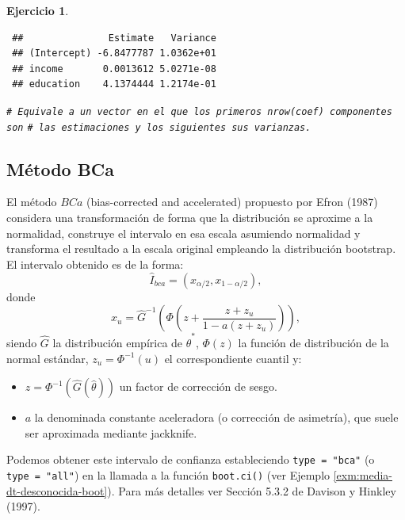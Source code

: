 \documentclass[
  spanish,
  10pt,
]{book}
\newenvironment{Shaded}{\begin{snugshade}}{\end{snugshade}}
\newcommand{\CommentTok}[1]{\textcolor[rgb]{0.56,0.35,0.01}{\textit{#1}}}
\providecommand{\tightlist}{%
  \setlength{\itemsep}{0pt}\setlength{\parskip}{0pt}}
\theoremstyle{break}
\newtheorem{exercise}{Ejercicio}[chapter]
\theoremstyle{nonumberplain}
\renewcommand{\CommentTok}[1]{\textcolor[rgb]{0.41,0.41,0.41}{\texttt{#1}}}
\begin{document}
\begin{exercise}
\begin{verbatim}
 ##               Estimate   Variance
 ## (Intercept) -6.8477787 1.0362e+01
 ## income       0.0013612 5.0271e-08
 ## education    4.1374444 1.2174e-01
\end{verbatim}

\begin{Shaded}
\begin{Highlighting}[]
\CommentTok{\# Equivale a un vector en el que los primeros \textasciigrave{}nrow(coef)\textasciigrave{} componentes son}
\CommentTok{\# las estimaciones y los siguientes sus varianzas.}
\end{Highlighting}
\end{Shaded}

\end{exercise}

\subsection{Método BCa}\label{boot-ic-bca}

El método \(BCa\) (bias-corrected and accelerated) propuesto por Efron (1987) considera una transformación de forma que la distribución se aproxime a la normalidad, construye el intervalo en esa escala asumiendo normalidad y transforma el resultado a la escala original empleando la distribución bootstrap.
El intervalo obtenido es de la forma:
\[\hat{I}_{bca}=\left( x_{\alpha /2}, x_{1-\alpha /2}  \right),\]
donde\\
\[x_u = \hat G^{-1}\left(\Phi\left(z + \frac{z + z_u}{1-a(z+z_u)}\right)  \right),\]
siendo \(\hat G\) la distribución empírica de \(\hat{\theta}^{\ast}\), \(\Phi(z)\) la función de distribución de la normal estándar, \(z_u = \Phi^{-1}(u)\) el correspondiente cuantil y:

\begin{itemize}
\tightlist
\item
  \(z = \Phi^{-1}(\hat G(\hat\theta))\) un factor de corrección de sesgo.
\item
  \(a\) la denominada constante aceleradora (o corrección de asimetría), que suele ser aproximada mediante jackknife.
\end{itemize}

Podemos obtener este intervalo de confianza estableciendo \texttt{type\ =\ "bca"} (o \texttt{type\ =\ "all"}) en la llamada a la función \texttt{boot.ci()} (ver Ejemplo \ref{exm:media-dt-desconocida-boot}).
Para más detalles ver Sección 5.3.2 de Davison y Hinkley (1997).
\end{document}
